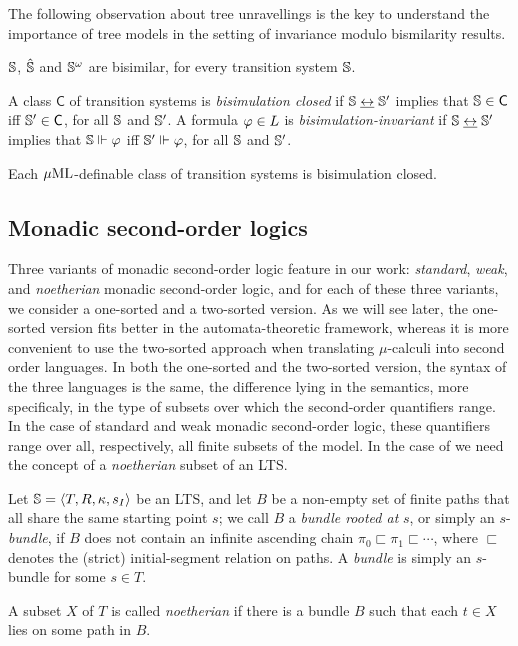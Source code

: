 The following observation about tree unravellings is the key to understand
the importance of tree models in the setting of invariance modulo bismilarity
results.

\begin{fact}
    \label{prop:tree_unrav}
$\mathbb{S}$, $\hat{\mathbb{S}}$ and $\mathbb{S}^{\omega}$ are bisimilar, for every transition
system $\mathbb{S}$.
\end{fact}

A class $\mathsf{C}$ of transition systems is \emph{bisimulation closed} if 
$\mathbb{S} \mathrel{\underline{\leftrightarrow}} \mathbb{S}'$ implies that $\mathbb{S} \in \mathsf{C}$ iff $\mathbb{S}'
\in \mathsf{C}$, for all $\mathbb{S}$ and $\mathbb{S}'$.
A formula $\varphi \in L$ is \emph{bisimulation-invariant} if $\mathbb{S} \mathrel{\underline{\leftrightarrow}}
\mathbb{S}'$ implies that $\mathbb{S} \Vdash \varphi$ iff $\mathbb{S}'
\Vdash \varphi$, for all $\mathbb{S}$ and $\mathbb{S}'$.

\begin{fact}
Each $\mu\mathrm{ML}$-definable class of transition systems is bisimulation closed.
\end{fact}


\subsection{Monadic second-order logics}
\label{sec:prel-so}
% 

Three variants of monadic second-order logic feature in our work:
\emph{standard}, \emph{weak}, and \emph{noetherian} monadic second-order 
logic, and for each of these three variants, we consider a one-sorted and 
a two-sorted version.
As we will see later, the one-sorted version fits better in the 
automata-theoretic framework, whereas it is more convenient to use the 
two-sorted approach when translating $\mu$-calculi into second order languages.
In both the one-sorted and the two-sorted version, the syntax of the three 
languages is the same, the difference lying in the semantics, more specificaly,
in the type of subsets over which the second-order quantifiers range.
In the case of standard and weak monadic second-order logic, these quantifiers 
range over all, respectively, all finite subsets of the model.
In the case of \nmso we need the concept of a \emph{noetherian} subset of an LTS.

\begin{definition}
\label{d:bundle1}
Let $\mathbb{S} = \langle{T,R,\kappa, s_I}\rangle$ be an LTS, and let $B$ be a non-empty set 
of finite paths that all share the same starting point $s$; we call $B$ a 
\emph{bundle rooted at} $s$, or simply an $s$-\emph{bundle}, if $B$ does not
contain an infinite ascending chain $\pi_{0} \sqsubset \pi_{1} \sqsubset 
\cdots$, where $\sqsubset$ denotes the (strict) initial-segment relation on 
paths.
A \emph{bundle} is simply an $s$-bundle for some $s \in T$.

A subset $X$ of $T$ is called \emph{noetherian} if there is a bundle $B$ such
that each $t \in X$ lies on some path in $B$.
\end{definition}

